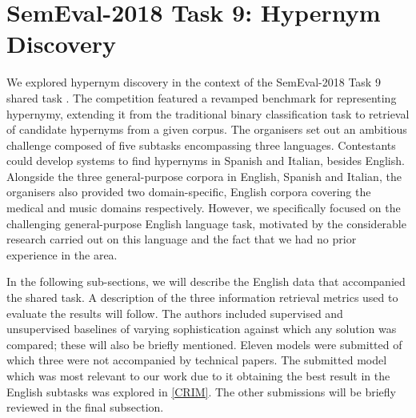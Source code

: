 \section{SemEval-2018 Task 9: Hypernym Discovery}
%

We explored hypernym discovery in the context of the SemEval-2018 Task 9 shared task \citep{camacho2018semeval}.  The competition featured a revamped benchmark for representing hypernymy, extending it from the traditional binary classification task to retrieval of candidate hypernyms from a given corpus.  The organisers set out an ambitious challenge composed of five subtasks encompassing three languages.  Contestants could develop systems to find hypernyms in Spanish and Italian, besides English.  Alongside the three general-purpose corpora in English, Spanish and Italian, the organisers also provided two domain-specific, English corpora covering the medical and music domains respectively.  However, we specifically focused on the challenging general-purpose English language task, motivated by the considerable research carried out on this language and the fact that we had no prior experience in the area.

In the following sub-sections, we will describe the English data that accompanied the shared task. A description of the three information retrieval  metrics used to evaluate the results will follow. The authors included supervised and unsupervised baselines of varying sophistication against which any solution was compared; these will also be briefly mentioned.  Eleven models were submitted of which three were not accompanied by technical papers.  The submitted model which was most relevant to our work due to it obtaining the best result in the English subtasks was explored in \cref{CRIM}.  The other submissions will be briefly reviewed in the final subsection.

